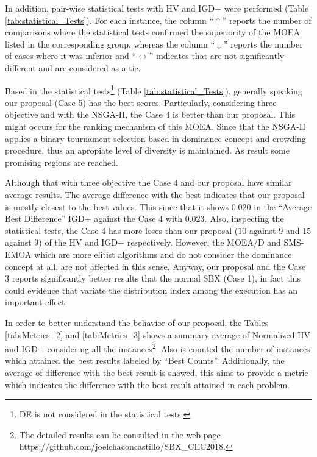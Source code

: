 In addition, pair-wise statistical tests with HV and IGD+ were performed (Table \ref{tab:statistical_Tests}).
%
For each instance, the column ``$\uparrow$'' reports the number of comparisons where the statistical tests confirmed the superiority of the MOEA listed in the corresponding group, whereas the column ``$\downarrow$'' reports the number of cases where it was inferior and ``$\longleftrightarrow$'' indicates that are not significantly different and are considered as a tie.


Based in the statistical tests\footnote{DE is not considered in the statistical tests.} (Table \ref{tab:statistical_Tests}), generally speaking our proposal (Case 5) has the best scores.
%
Particularly, considering three objective and with the NSGA-II, the Case 4 is better than our proposal.
%
This might occurs for the ranking mechanism of this MOEA.
%
Since that the NSGA-II applies a binary tournament selection based in dominance concept and crowding procedure, thus an apropiate level of diversity is maintained.
%
As result some promising regions are reached.

%
Although that with three objective the Case 4 and our proposal have similar average results.
%
The average difference with the best indicates that our proposal is mostly closest to the best values.
%
This since that it shows $0.020$ in the ``Average Best Difference'' IGD+ against the Case 4 with $0.023$.
%
Also, inspecting the statistical tests, the Case 4 has more loses than our proposal ($10$ against $9$ and $15$ against $9$) of the HV and IGD+ respectively.
%
However, the MOEA/D and SMS-EMOA which are more elitist algorithms and do not consider the dominance concept at all, are not affected in this sense.
%
Anyway, our proposal and the Case 3 reports significantly better results that the normal SBX (Case 1), in fact this could evidence that variate the distribution index among the execution has an important effect.


In order to better understand the behavior of our proposal, the Tables \ref{tab:Metrics_2} and \ref{tab:Metrics_3} shows a summary average of Normalized HV and IGD+ considering all the instances\footnote{The detailed results can be consulted in the web page https:\//\//github.com\//joelchaconcastillo\//SBX\_CEC2018.}.
%
Also is counted the number of instances which attained the best results labeled by ``Best Counts''.
%
Additionally, the average of difference with the best result is showed, this aims to provide a metric which indicates the difference with the best result attained in each problem.
%

